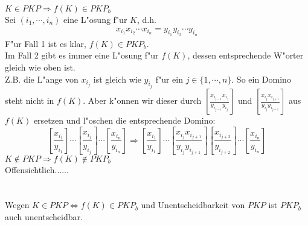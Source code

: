 \documentclass[a4paper,11pt]{scrartcl}
\begin{document}
	\noindent \textcolor{rwth-blue}{$K \in PKP \Longrightarrow f(K) \in PKP_b$}\\
	Sei $(i_1,\cdots ,i_n)$ eine L"osung f"ur $K$, d.h.
	\begin{align*}
		x_{i_1} x_{i_2} \cdots x_{i_n} = y_{i_1} y_{i_2} \cdots y_{i_n}
	\end{align*}
	F"ur Fall 1 ist es klar, $f(K) \in PKP_b$.\\
	Im Fall 2 gibt es immer eine L"osung f"ur $f(K)$, dessen entsprechende W"orter gleich wie oben ist.\\
	Z.B. die L"ange von $x_{i_j}$ ist gleich wie $y_{i_j}$ f"ur ein $j \in \{1,\cdots, n\}$. So ein Domino steht nicht in $f(K)$. Aber k"onnen wir dieser durch $\left[ \frac{x_{i_{j-1}} x_{i_j}}{y_{i_{j-1}} y_{i_j}} \right]$ und $\left[ \frac{x_{i_{j}} x_{i_{j+1}}}{y_{i_{j}} y_{i_{j+1}}} \right]$ aus $f(K)$ ersetzen und l"oschen die entsprechende Domino:\\
	$$
	  \left[ \frac{x_{i_{1}}}{y_{i_{1}}} \right] \cdots  \left[ \frac{x_{i_{j}}}{y_{i_{j}}} \right]  \cdots \left[ \frac{x_{i_{n}}}{y_{i_{n}}} \right] \Longrightarrow \left[ \frac{x_{i_{1}}}{y_{i_{1}}} \right] \cdots  \left[ \frac{x_{i_{j}} x_{i_{j+1}}}{y_{i_{j}} y_{i_{j+1}}} \right] \left[ \frac{x_{i_{j+2}}}{y_{i_{j+2}}} \right] \cdots \left[ \frac{x_{i_{n}}}{y_{i_{n}}} \right]
	$$
	\textcolor{rwth-blue}{$K \notin PKP \Longrightarrow f(K) \notin PKP_b$}\\
	Offensichtlich......\\
	\\ \ \\
	Wegen $K\in PKP \iff f(K) \in PKP_b$ und Unentscheidbarkeit von $PKP$ ist $PKP_b$ auch unentscheidbar.
	
	
	
	
	 
	
	
\end{document}
